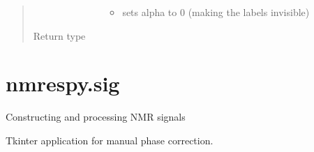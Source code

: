 \documentclass[letterpaper,10pt,english]{sphinxmanual}
\begin{document}
\begin{fulllineitems}
\begin{quote}
\begin{description}
\begin{itemize}
\begin{description}
\begin{itemize}
\item {} 
\sphinxAtStartPar
{} sets alpha to 0 (making the labels invisible)

\end{itemize}

\end{description}

\end{itemize}


\item[{Return type}] \leavevmode
\sphinxAtStartPar
{\hyperref[\detokenize{references/plot:nmrespy.plot.NmrespyPlot}]{}}

\end{description}\end{quote}

\end{fulllineitems}





\section{nmrespy.sig}
\label{\detokenize{references/sig:module-nmrespy.sig}}\label{\detokenize{references/sig:nmrespy-sig}}\label{\detokenize{references/sig::doc}}
\sphinxAtStartPar
Constructing and processing NMR signals

\begin{fulllineitems}
\label{\detokenize{references/sig:nmrespy.sig.PhaseApp}}
\sphinxAtStartPar
Tkinter application for manual phase correction.


\nopagebreak


\sphinxAtStartPar
{\hyperref[\detokenize{references/sig:nmrespy.sig.manual_phase_spectrum}]{}}



\end{fulllineitems}

\end{document}
